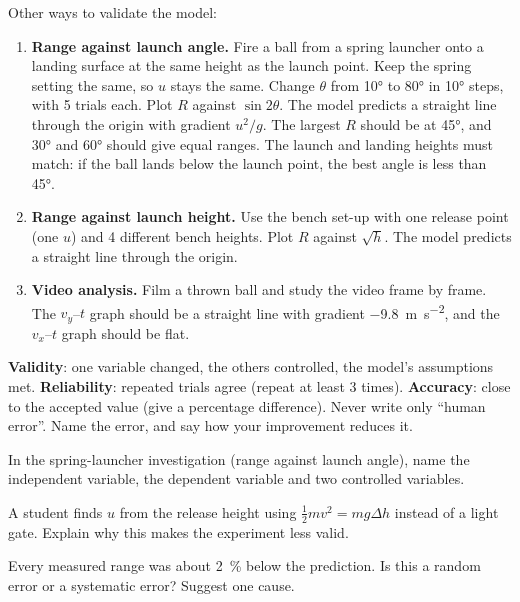 Other ways to validate the model:
\begin{enumerate}
  \item \textbf{Range against launch angle.} Fire a ball from a spring launcher onto a landing
        surface at the same height as the launch point. Keep the spring setting the same, so
        $u$ stays the same. Change $\theta$ from \ang{10} to \ang{80} in \ang{10} steps, with 5
        trials each. Plot $R$ against $\sin 2\theta$. The model predicts a straight line
        through the origin with gradient $u^2/g$. The largest $R$ should be at \ang{45}, and
        \ang{30} and \ang{60} should give equal ranges. The launch and landing heights must
        match: if the ball lands below the launch point, the best angle is less than \ang{45}.
  \item \textbf{Range against launch height.} Use the bench set-up with one release point (one
        $u$) and 4 different bench heights. Plot $R$ against $\sqrt{h}$. The model predicts a
        straight line through the origin.
  \item \textbf{Video analysis.} Film a thrown ball and study the video frame by frame. The
        $v_y$--$t$ graph should be a straight line with gradient \qty{-9.8}{m.s^{-2}}, and the
        $v_x$--$t$ graph should be flat.
\end{enumerate}

\begin{examtip}
\textbf{Validity}: one variable changed, the others controlled, the model's assumptions met.
\textbf{Reliability}: repeated trials agree (repeat at least 3 times). \textbf{Accuracy}: close
to the accepted value (give a percentage difference). Never write only ``human error''. Name
the error, and say how your improvement reduces it.
\end{examtip}

\begin{quickcheck}
  \item In the spring-launcher investigation (range against launch angle), name the
        independent variable, the dependent variable and two controlled variables.
  \item A student finds $u$ from the release height using $\frac{1}{2}mv^2 = mg\Delta h$
        instead of a light gate. Explain why this makes the experiment less valid.
  \item Every measured range was about \qty{2}{\percent} below the prediction. Is this a random
        error or a systematic error? Suggest one cause.
\end{quickcheck}

